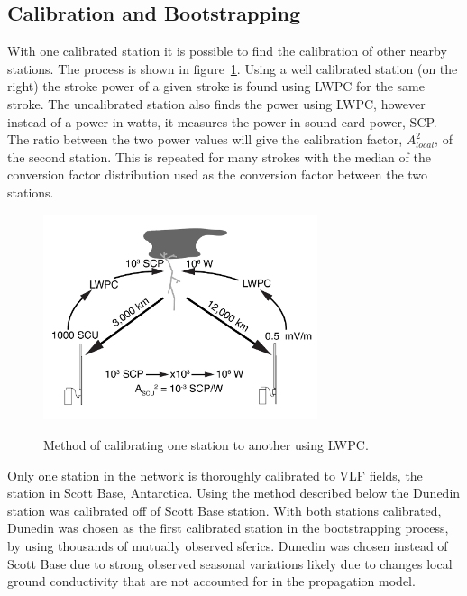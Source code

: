 \subsection{Calibration and Bootstrapping}

With one calibrated station it is possible to find the calibration of other nearby stations.
The process is shown in figure~\ref{calibrate}.
Using a well calibrated station (on the right) the stroke power of a given stroke is found using LWPC for the same stroke.
The uncalibrated station also finds the power using LWPC, however instead of a power in watts, it measures the power in sound card power, SCP.
The ratio between the two power values will give the calibration factor, $A_{local}^2$, of the second station.
This is repeated for many strokes with the median of the conversion factor distribution used as the conversion factor between the two stations.

\begin{figure}[t]
\noindent\includegraphics[width=19pc,angle=0]{energy/Figures/PPS_Method.pdf}\\
\caption{Method of calibrating one station to another using LWPC.}
\label{calibrate}
\end{figure}

Only one station in the network is thoroughly calibrated to VLF fields, the station in Scott Base, Antarctica.
Using the method described below the Dunedin station was calibrated off of Scott Base station.
With both stations calibrated, Dunedin was chosen as the first calibrated station in the bootstrapping process, by using thousands of mutually observed sferics.
Dunedin was chosen instead of Scott Base due to strong observed seasonal variations likely due to changes local ground conductivity that are not accounted for in the propagation model.


